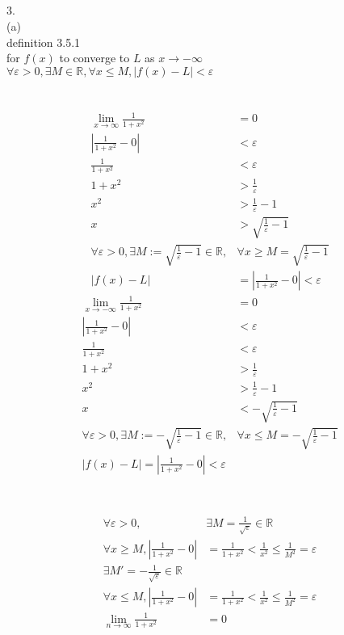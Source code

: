 \documentclass[12pt, border = 4pt, multi]{article} %
\begin{document}
\\
\\
\\
\\
3.\\
(a)\\
definition 3.5.1\\
for $f(x)$ to converge to $L$ as $x \rightarrow -\infty$\\
$\forall \varepsilon > 0, \exists M \in \mathbb{R}, \forall x \leq M, |f(x) - L| < \varepsilon$\\
\\
\\
\begin{align*}
\lim_{x \rightarrow \infty} \frac{1}{1 + x ^ 2} &= 0\\
\left|\frac{1}{1 + x ^ 2} - 0\right| &< \varepsilon\\
\frac{1}{1 + x ^ 2} &< \varepsilon\\
1 + x ^ 2 &> \frac{1}{\varepsilon}\\
x ^ 2 &> \frac{1}{\varepsilon} - 1\\
x &> \sqrt{\frac{1}{\varepsilon} - 1}\\
\forall \varepsilon > 0, \exists M := \sqrt{\frac{1}{\varepsilon} - 1} \in \mathbb{R}, &\forall x \geq M = \sqrt{\frac{1}{\varepsilon} - 1}\\
|f(x) - L| &= \left|\frac{1}{1 + x ^ 2} - 0\right| < \varepsilon
\end{align*}
\begin{align*}
\lim_{x \rightarrow -\infty} \frac{1}{1 + x ^ 2} &= 0\\
\left|\frac{1}{1 + x ^ 2} - 0\right| &< \varepsilon\\
\frac{1}{1 + x ^ 2} &< \varepsilon\\
1 + x ^ 2 &> \frac{1}{\varepsilon}\\
x ^ 2 &> \frac{1}{\varepsilon} - 1\\
x &< -\sqrt{\frac{1}{\varepsilon} - 1}\\
\forall \varepsilon > 0, \exists M := -\sqrt{\frac{1}{\varepsilon} - 1} \in \mathbb{R}, &\forall x \leq M = -\sqrt{\frac{1}{\varepsilon} - 1}\\
|f(x) - L| = \left|\frac{1}{1 + x ^ 2} - 0\right| < \varepsilon\\
\end{align*}
\\
\\
\begin{align*}
\forall \varepsilon > 0, &\exists M = \frac{1}{\sqrt{\varepsilon}} \in \mathbb{R}\\
\forall x \geq M, \left|\frac{1}{1 + x ^ 2} - 0\right| &= \frac{1}{1 + x ^ 2} < \frac{1}{x ^ 2} \leq \frac{1}{M ^ 2} = \varepsilon\\
\exists M' = -\frac{1}{\sqrt{\varepsilon}} \in \mathbb{R}\\
\forall x \leq M, \left|\frac{1}{1 + x ^ 2} - 0\right| &= \frac{1}{1 + x ^ 2} < \frac{1}{x ^ 2} \leq \frac{1}{M ^ 2} = \varepsilon\\
\lim_{n \rightarrow \infty} \frac{1}{1 + x ^ 2} &= 0
\end{align*}
\end{document}
